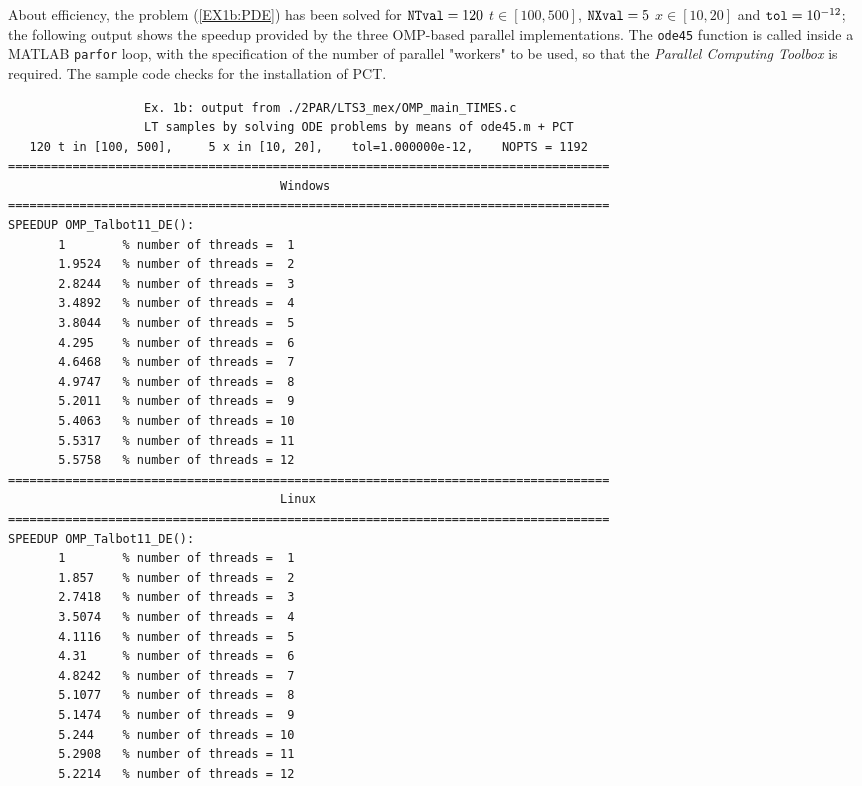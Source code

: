 \documentclass[a4paper,10pt]{report}%
\begin{document}
About efficiency, the problem (\ref{EX1b:PDE}) has been solved for ${\tt NTval}=120$ $t\in[100,500]$,
${\tt NXval}=5$ $x\in[10,20]$ and ${\tt tol}=10^{-12}$; the following output shows the speedup
provided by the three OMP-based parallel implementations. The {\tt ode45} function is called inside a MATLAB
{\tt parfor} loop, with the specification of the number of parallel "workers" to be used, so that the
{\em Parallel Computing Toolbox} is required. The sample code checks for the installation of PCT.
\begin{lstlisting}
                   Ex. 1b: output from ./2PAR/LTS3_mex/OMP_main_TIMES.c
                   LT samples by solving ODE problems by means of ode45.m + PCT
   120 t in [100, 500],     5 x in [10, 20],    tol=1.000000e-12,    NOPTS = 1192
====================================================================================
                                      Windows
====================================================================================
SPEEDUP OMP_Talbot11_DE():
       1        % number of threads =  1
       1.9524   % number of threads =  2
       2.8244   % number of threads =  3
       3.4892   % number of threads =  4
       3.8044   % number of threads =  5
       4.295    % number of threads =  6
       4.6468   % number of threads =  7
       4.9747   % number of threads =  8
       5.2011   % number of threads =  9
       5.4063   % number of threads = 10
       5.5317   % number of threads = 11
       5.5758   % number of threads = 12
====================================================================================
                                      Linux
====================================================================================
SPEEDUP OMP_Talbot11_DE():
       1        % number of threads =  1
       1.857    % number of threads =  2
       2.7418   % number of threads =  3
       3.5074   % number of threads =  4
       4.1116   % number of threads =  5
       4.31     % number of threads =  6
       4.8242   % number of threads =  7
       5.1077   % number of threads =  8
       5.1474   % number of threads =  9
       5.244    % number of threads = 10
       5.2908   % number of threads = 11
       5.2214   % number of threads = 12


\end{lstlisting}
\end{document}
